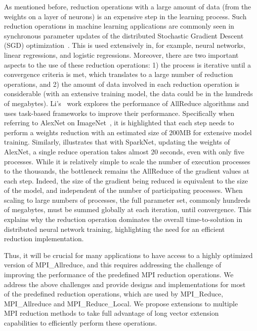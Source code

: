 \documentclass[5p,times,twocolumn]{elsarticle}
\newcommand{\mpi}[0]{\textsc{MPI}\xspace}
\newcommand{\allreduce}[0]{AllReduce\xspace}
\begin{document}
As mentioned before, reduction operations with a large amount of
data (from the weights on a layer of neurons) is an expensive step in the
learning process.
Such reduction operations in machine learning applications
are commonly seen in synchronous parameter updates of the distributed Stochastic
Gradient Descent (SGD) optimization~\cite{sgd10}. This is used extensively
in, for example, neural networks, linear regressions, and logistic
regressions. Moreover, there are two important aspects to the use of these reduction operations: 1) the process is iterative until a convergence criteria is met, which translates to a large number of reduction
operations, and 2) the amount of data involved in each reduction operation is considerable (with an extensive training model, the data could be in the hundreds of megabytes).
%
Li's~\cite{inproceedings} work explores the performance of \allreduce algorithms
and uses task-based frameworks to improve their performance. Specifically when referring to AlexNet on ImageNet~\cite{NIPS20124824}, it is highlighted that
each step needs to perform a weights reduction with an estimated size
of 200MB for extensive model training.
%
Similarly, \cite{moritz2015sparknet}
illustrates that with SparkNet, updating the weights of AlexNet, a single reduce
operation takes almost 20 seconds, even with only five processes. While it is relatively simple to scale the number of execution processes to the thousands, the bottleneck remains the \allreduce of
the gradient values at each step. Indeed, the size of the gradient being reduced is equivalent
to the size of the model, and independent of the number of participating processes. When scaling to large numbers of processes, the full parameter set, commonly hundreds of
megabytes, must be summed globally at each iteration, until convergence. This explains why the reduction operation dominates the overall time-to-solution in distributed neural network
training, highlighting the need for an efficient reduction implementation.

Thus, it will be crucial for many applications to have access to a highly optimized version of MPI\_Allreduce, and this requires addressing the challenge of improving the performance of the predefined MPI reduction operations. We address the above challenges and provide designs and implementations for most of the predefined reduction operations, which are used by MPI\_Reduce, MPI\_Allreduce and MPI\_Reduce\_Local.
We propose extensions to multiple \mpi reduction methods to take full advantage of long vector extension capabilities to efficiently perform these operations.
\end{document}
